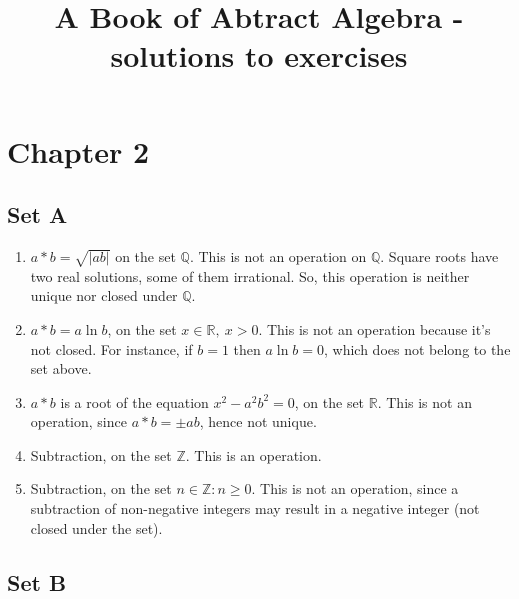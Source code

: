 \documentclass{article}
\title{A Book of Abtract Algebra - solutions to exercises}
\begin{document}
\maketitle

\section*{Chapter 2}
\subsection*{Set A}
\begin{enumerate}
\item $a * b = \sqrt{|ab|}$ on the set $\mathbb{Q}$. This is not an operation on $\mathbb{Q}$. Square roots have two real solutions, some of them irrational. So, this operation is neither unique nor closed under $\mathbb{Q}$.

\item $a * b = a \ln b$, on the set ${x \in \mathbb{R}},\ x > 0$. This is not an operation because it's not closed. For instance, if $b = 1$ then $a\ln b = 0$, which does not belong to the set above.

\item $a * b$ is a root of the equation $x^2 - a^2b^2 = 0$, on the set $\mathbb{R}$. This is not an operation, since $a * b = \pm ab$, hence not unique.

\item Subtraction, on the set $\mathbb{Z}$. This is an operation.

\item Subtraction, on the set ${n \in \mathbb{Z} : n \geq 0}$. This is not an operation, since a subtraction of non-negative integers may result in a negative integer (not closed under the set).

\end{enumerate}

\subsection*{Set B}
\end{document}
